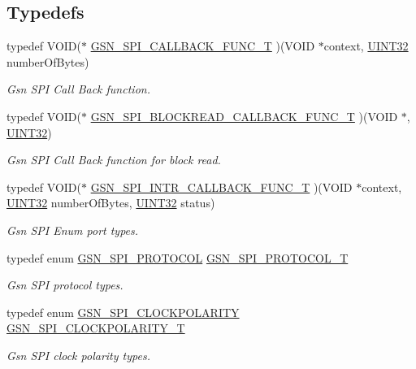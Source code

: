 \subsection*{Typedefs}
\begin{DoxyCompactItemize}
\item 
typedef VOID($\ast$ \hyperlink{a00655_gad27c6db61273e0b521637db94b638cdb}{GSN\_\-SPI\_\-CALLBACK\_\-FUNC\_\-T} )(VOID $\ast$context, \hyperlink{a00660_gae1e6edbbc26d6fbc71a90190d0266018}{UINT32} numberOfBytes)
\begin{DoxyCompactList}\small\item\em Gsn SPI Call Back function. \end{DoxyCompactList}\item 
typedef VOID($\ast$ \hyperlink{a00655_ga40c92f454b32d5fffa9780896cecdd02}{GSN\_\-SPI\_\-BLOCKREAD\_\-CALLBACK\_\-FUNC\_\-T} )(VOID $\ast$, \hyperlink{a00660_gae1e6edbbc26d6fbc71a90190d0266018}{UINT32})
\begin{DoxyCompactList}\small\item\em Gsn SPI Call Back function for block read. \end{DoxyCompactList}\item 
typedef VOID($\ast$ \hyperlink{a00655_ga4319e7be0e14776c7cd2c7ff7ca8f2c2}{GSN\_\-SPI\_\-INTR\_\-CALLBACK\_\-FUNC\_\-T} )(VOID $\ast$context, \hyperlink{a00660_gae1e6edbbc26d6fbc71a90190d0266018}{UINT32} numberOfBytes, \hyperlink{a00660_gae1e6edbbc26d6fbc71a90190d0266018}{UINT32} status)
\begin{DoxyCompactList}\small\item\em Gsn SPI Enum port types. \end{DoxyCompactList}\item 
typedef enum \hyperlink{a00655_gaaabdab9df4e565fb0f07162bb2f22dc4}{GSN\_\-SPI\_\-PROTOCOL} \hyperlink{a00655_gafc404344d5f8c6a8358fa3be07a87444}{GSN\_\-SPI\_\-PROTOCOL\_\-T}
\begin{DoxyCompactList}\small\item\em Gsn SPI protocol types. \end{DoxyCompactList}\item 
typedef enum \hyperlink{a00655_ga6d27ddbf02c08f4f80f88328bb907f94}{GSN\_\-SPI\_\-CLOCKPOLARITY} \hyperlink{a00655_ga40c914db809ec79fd3a564dda8364aea}{GSN\_\-SPI\_\-CLOCKPOLARITY\_\-T}
\begin{DoxyCompactList}\small\item\em Gsn SPI clock polarity types. \end{DoxyCompactList}\item 

\end{DoxyCompactItemize}
